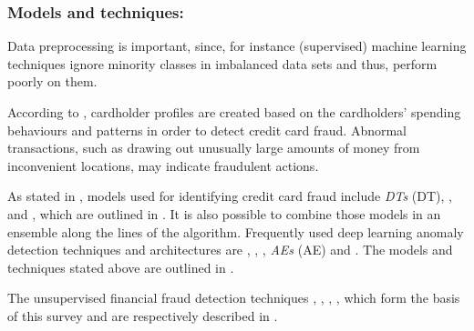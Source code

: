 \subsubsection{Models and techniques:}
Data preprocessing is important, since, for instance (supervised) machine learning techniques ignore minority classes in imbalanced data sets and thus, perform poorly on them.

According to \cite{ff_profiles}, cardholder profiles are created based on the cardholders' spending behaviours and patterns in order to detect credit card fraud. Abnormal transactions, such as drawing out unusually large amounts of money from inconvenient locations, may indicate fraudulent actions.

As stated in \cite{ff_review_techniques}, models used for identifying credit card fraud include \textit{\aclp{DT}} (\acs{DT}), ,  and , which are outlined in \cite{sahin2010detecting}. It is also possible to combine those models in an ensemble along the lines of the  algorithm.
Frequently used deep learning anomaly detection techniques and architectures are , , , \textit{\aclp{AE}} (\acs{AE}) and .
The models and techniques stated above are outlined in \cite{ff_review_techniques}.

The unsupervised financial fraud detection techniques , , , , which form the basis of this survey and are respectively described in \cite{liu2008isolation, cf_AE, fd_ARIMA, fd_SOM, credit_f_SOM}.